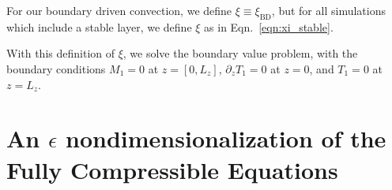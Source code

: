 For our boundary driven convection, we define $\xi \equiv \xi_{\text{BD}}$, but for all simulations which include a stable layer, we define $\xi$ as in Eqn.~\ref{eqn:xi_stable}.

With this definition of $\xi$, we solve the boundary value problem,
with the boundary conditions $M_1 = 0$ at $z = [0, L_z]$, $\partial_z T_1 = 0$ at $z = 0$, and $T_1 = 0$ at $z = L_z$.



\section{An $\epsilon$ nondimensionalization of the Fully Compressible Equations}
